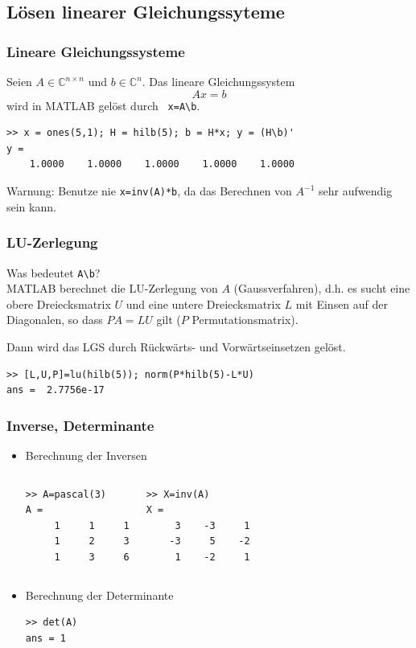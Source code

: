 \subsection{Lösen linearer Gleichungssyteme}
% 
%
\begin{frame}[fragile]\frametitle{Lineare Gleichungssysteme}
Seien $A \in \mathbb{C}^{n\times n}$ und $b \in \mathbb{C}^n$. Das
lineare Gleichungssystem 
{ \[ A x=b \]}
wird in MATLAB gelöst durch  \lstinline! x=A\b!.\\

\begin{lstlisting}
>> x = ones(5,1); H = hilb(5); b = H*x; y = (H\b)'
y =
    1.0000    1.0000    1.0000    1.0000    1.0000
\end{lstlisting}

\alert{Warnung:} Benutze nie
\lstinline!x=inv(A)*b!, da das Berechnen von $A^{-1}$ sehr aufwendig sein kann.
\end{frame}
% 
%
\begin{frame}[fragile]\frametitle{LU-Zerlegung}
{\centering  Was bedeutet \lstinline!A\b!?}\\[0.5cm]

MATLAB berechnet die LU-Zerlegung von $A$ (Gaussverfahren), d.h.
es sucht eine obere Dreiecksmatrix $U$ und eine untere Dreiecksmatrix
$L$ mit Einsen auf der Diagonalen, so dass $PA=LU$ gilt        
 ($P$ Permutationsmatrix).

Dann wird das LGS durch Rückwärts- und Vorwärtseinsetzen gelöst. 
\begin{lstlisting}
>> [L,U,P]=lu(hilb(5)); norm(P*hilb(5)-L*U)
ans =  2.7756e-17
\end{lstlisting}
\end{frame}
% 
%
\begin{frame}[fragile]\frametitle{Inverse,  Determinante}
\begin{itemize}
\item Berechnung der Inversen
\begin{columns}
\begin{lstlisting}
>> A=pascal(3)
A =
     1     1     1
     1     2     3
     1     3     6
\end{lstlisting}
\begin{lstlisting}
>> X=inv(A)
X =
     3    -3     1
    -3     5    -2
     1    -2     1
\end{lstlisting}
\end{columns}
\item Berechnung der Determinante
\begin{lstlisting}
>> det(A)
ans = 1
\end{lstlisting}
\end{itemize}
\end{frame}
